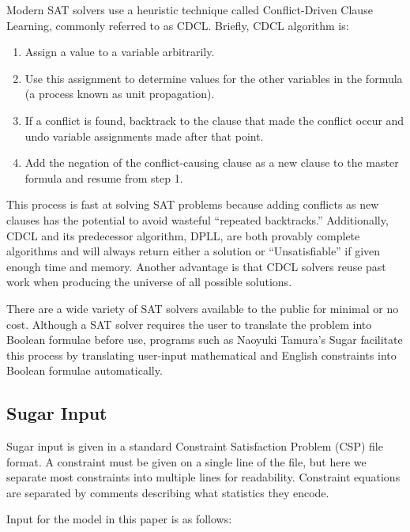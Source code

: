 \documentclass[runningheads]{llncs}
\begin{document}
Modern SAT solvers use a heuristic technique called Conflict-Driven
Clause Learning, commonly referred to as CDCL\cite{cdcl}. Briefly, CDCL algorithm
is:

\begin{enumerate}

\item Assign a value to a variable arbitrarily.
\item Use this assignment to determine values for the other variables
  in the formula (a process known as unit propagation).
\item If a conflict is found, backtrack to the clause that made the
  conflict occur and undo variable assignments made after that point.
\item Add the negation of the conflict-causing clause as a new clause
  to the master formula and resume from step 1.

\end{enumerate}

This process is fast at solving SAT problems because adding conflicts as new clauses
has the potential to avoid wasteful ``repeated backtracks.''
Additionally, CDCL and its predecessor algorithm, DPLL, are both
provably complete algorithms and will always return either a solution
or ``Unsatisfiable'' if given enough time and memory. Another
advantage is that CDCL solvers reuse past work when producing the universe of all
possible solutions.

There are a wide variety of SAT solvers available to the public for
minimal or no cost. Although a SAT solver requires the user to
translate the problem into Boolean formulae before use, programs such
as Naoyuki Tamura's Sugar facilitate this process by translating
user-input mathematical and English constraints into Boolean formulae
automatically.

\subsection{Sugar Input}

Sugar input is given in a standard Constraint Satisfaction Problem
(CSP) file format. A constraint must be given on a single line of the
file, but here we separate most constraints into multiple lines for
readability. Constraint equations are separated by comments describing
what statistics they encode.

Input for the model in this paper is as follows:

\end{document}
